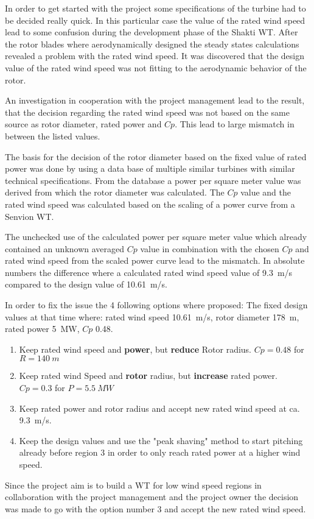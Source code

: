 In order to get started with the project some specifications of the turbine had to be decided really quick.
In this particular case the value of the rated wind speed lead to some confusion during the development phase of the Shakti WT.
After the rotor blades where aerodynamically designed the steady states calculations revealed a problem with the rated wind speed.
It was discovered that the design value of the rated wind speed was not fitting to the aerodynamic behavior of the rotor.

An investigation in cooperation with the project management lead to the result, that the decision regarding the rated wind speed was not based on the same source as rotor diameter, rated power and $Cp$.
This lead to large mismatch in between the listed values.

The basis for the decision of the rotor diameter based on the fixed value of rated power was done by using a data base of multiple similar turbines with similar technical specifications.
From the database a power per square meter value was derived from which the rotor diameter was calculated.
The $Cp$ value and the rated wind speed was calculated based on the scaling of a power curve from a Senvion WT.

The unchecked use of the calculated power per square meter value which already contained an unknown averaged $Cp$ value in combination with the chosen $Cp$ and rated wind speed from the scaled power curve lead to the mismatch. In absolute numbers the difference where a calculated rated wind speed value of \SI{9.3}{m/s} compared to the design value of \SI{10.61}{m/s}.

In order to fix the issue the 4 following options where proposed:
The fixed design values at that time where: rated wind speed \SI{10.61}{m/s}, rotor diameter \SI{178}{m}, rated power \SI{5}{MW}, $Cp$ \SI{0.48}{}.
\begin{enumerate}
	\item Keep rated wind speed and \textbf{power}, but \textbf{reduce} Rotor radius. $Cp = 0.48$ for $R = \SI{140}{m}$
	\item Keep rated wind Speed and \textbf{rotor} radius, but \textbf{increase} rated power. $Cp = 0.3$ for $P = \SI{5.5}{MW}$
	\item Keep rated power and rotor radius and accept new rated wind speed at ca. \SI{9.3}{m/s}.
	\item Keep the design values and use the "peak shaving" method to start pitching already before region 3 in order to only reach rated power at a higher wind speed.
\end{enumerate}

Since the project aim is to build a WT for low wind speed regions in collaboration with the project management and the project owner the decision was made to go with the option number 3 and accept the new rated wind speed. 